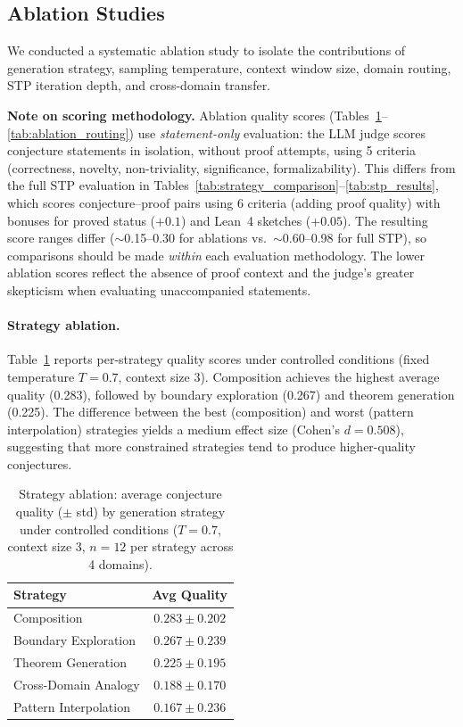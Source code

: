 \documentclass[11pt,a4paper]{article}
\begin{document}
\subsection{Ablation Studies}
\label{sec:ablation_results}

We conducted a systematic ablation study to isolate the contributions of generation strategy, sampling temperature, context window size, domain routing, STP iteration depth, and cross-domain transfer.

\textbf{Note on scoring methodology.} Ablation quality scores (Tables~\ref{tab:ablation_strategy}--\ref{tab:ablation_routing}) use \emph{statement-only} evaluation: the LLM judge scores conjecture statements in isolation, without proof attempts, using 5 criteria (correctness, novelty, non-triviality, significance, formalizability). This differs from the full STP evaluation in Tables~\ref{tab:strategy_comparison}--\ref{tab:stp_results}, which scores conjecture--proof pairs using 6 criteria (adding proof quality) with bonuses for proved status ($+0.1$) and Lean~4 sketches ($+0.05$). The resulting score ranges differ ($\sim$0.15--0.30 for ablations vs.\ $\sim$0.60--0.98 for full STP), so comparisons should be made \emph{within} each evaluation methodology. The lower ablation scores reflect the absence of proof context and the judge's greater skepticism when evaluating unaccompanied statements.

\paragraph{Strategy ablation.}
Table~\ref{tab:ablation_strategy} reports per-strategy quality scores under controlled conditions (fixed temperature $T{=}0.7$, context size 3). Composition achieves the highest average quality (0.283), followed by boundary exploration (0.267) and theorem generation (0.225). The difference between the best (composition) and worst (pattern interpolation) strategies yields a medium effect size (Cohen's $d = 0.508$), suggesting that more constrained strategies tend to produce higher-quality conjectures.

\begin{table}[h]
\centering
\caption{Strategy ablation: average conjecture quality ($\pm$ std) by generation strategy under controlled conditions ($T{=}0.7$, context size 3, $n{=}12$ per strategy across 4 domains).}
\label{tab:ablation_strategy}
\small
\begin{tabular}{@{}lc@{}}
\toprule
\textbf{Strategy} & \textbf{Avg Quality} \\
\midrule
Composition             & $0.283 \pm 0.202$ \\
Boundary Exploration    & $0.267 \pm 0.239$ \\
Theorem Generation      & $0.225 \pm 0.195$ \\
Cross-Domain Analogy    & $0.188 \pm 0.170$ \\
Pattern Interpolation   & $0.167 \pm 0.236$ \\
\bottomrule
\end{tabular}
\end{table}
\end{document}
